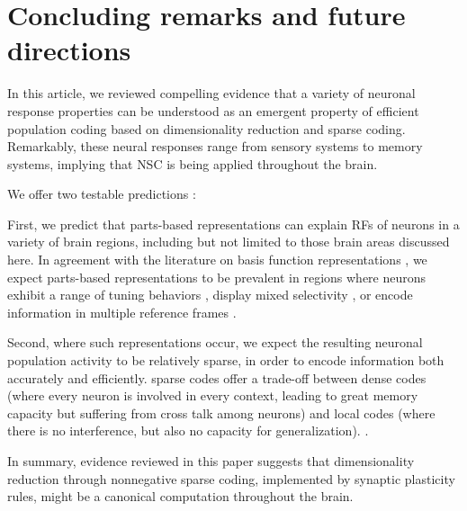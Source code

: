 \section*{Concluding remarks and future directions}
\label{sec:conclusion}

In this article, we reviewed compelling evidence that a variety of neuronal response properties can be understood as an emergent property of efficient population coding based on dimensionality reduction and sparse coding. Remarkably, these neural responses range from sensory systems to memory systems,
implying that \ac{NSC} is 
being applied throughout the brain.

We offer two testable predictions :

First, we predict that parts-based representations can explain
\acp{RF} of neurons in a variety of brain regions,
including but not limited to those brain areas discussed here. 
In agreement with the literature on basis function representations
\cite{PougetSejnowski1997,PougetSnyder2000,Poggio1990},
we expect parts-based representations
to be prevalent in regions where neurons
exhibit a range of tuning behaviors \cite{Beyeler2016},
display mixed selectivity \cite{Fusi2016,Eichenbaum2017},
or encode information in multiple reference frames \cite{AlexanderNitz2015,Rounds2016}.

Second, where such representations occur, we expect the resulting
neuronal population activity to be relatively sparse,
in order to encode information both accurately and efficiently.
sparse codes offer a trade-off between 
dense codes (where every neuron is involved in every context,
leading to great memory capacity but suffering from cross talk among neurons)
and local codes (where there is no interference, 
but also no capacity for generalization). %
.

In summary, evidence reviewed in this paper suggests
that dimensionality reduction through nonnegative sparse coding, 
implemented by synaptic plasticity rules, 
might be a canonical computation throughout the brain.

